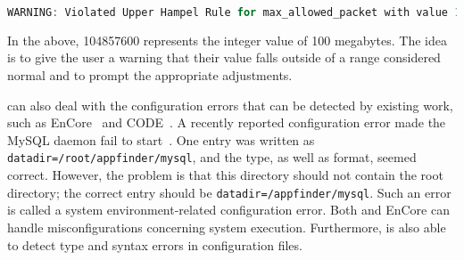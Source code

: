 \begin{lstlisting}[language=C, xleftmargin=.01\textwidth]
WARNING: Violated Upper Hampel Rule for max_allowed_packet with value 104857600 
\end{lstlisting} 

In the above, 104857600 represents the integer value of 100 megabytes. The idea is to give the user
a warning that their value falls outside of a range considered normal and to prompt the  
appropriate adjustments.

\app can also deal with the configuration errors that can be detected by
existing work, such as EnCore~\cite{zhang14encore} and
CODE~\cite{yuan11context}.
A recently reported configuration error made the MySQL
daemon fail to start~\cite{syserror}.
One entry was written as 
{\tt datadir=/root/appfinder/mysql}, and the type, as well as 
format, seemed correct.
However, the problem is that this directory should not 
contain the root directory; the correct entry
should be {\tt datadir=/appfinder/mysql}.
Such an error is called a system environment-related configuration error.
Both \app and EnCore can handle misconfigurations concerning system execution.
Furthermore, \app is also able to detect type and syntax errors
in configuration files.
